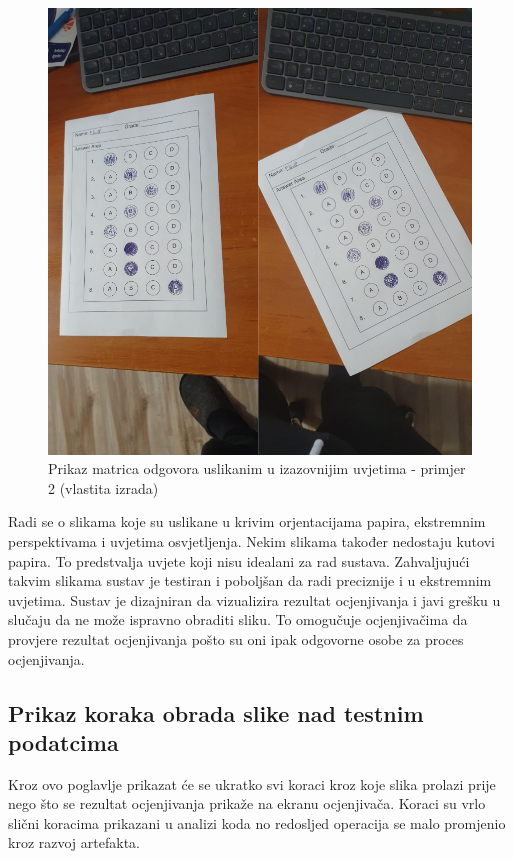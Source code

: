 \documentclass{foi}
\begin{document}
\begin{figure}[H]
\centering
\includegraphics[width=0.55\linewidth]{slike/Test4.png}
\caption{Prikaz matrica odgovora uslikanim u izazovnijim uvjetima - primjer 2 (vlastita izrada)}
\end{figure}

Radi se o slikama koje su uslikane u krivim orjentacijama papira, ekstremnim perspektivama i uvjetima osvjetljenja. Nekim slikama također nedostaju kutovi papira. To predstvalja uvjete koji nisu idealani za rad sustava. Zahvaljujući takvim slikama sustav je testiran i poboljšan da radi preciznije i u ekstremnim uvjetima. Sustav je dizajniran da vizualizira rezultat ocjenjivanja i javi grešku u slučaju da ne može ispravno obraditi sliku. To omogučuje ocjenjivačima da provjere rezultat ocjenjivanja pošto su oni ipak odgovorne osobe za proces ocjenjivanja.

\subsection{Prikaz koraka obrada slike nad testnim podatcima}

Kroz ovo poglavlje prikazat će se ukratko svi koraci kroz koje slika prolazi prije nego što se rezultat ocjenjivanja prikaže na ekranu ocjenjivača. Koraci su vrlo slični koracima prikazani u analizi koda no redosljed operacija se malo promjenio kroz razvoj artefakta.
\end{document}
